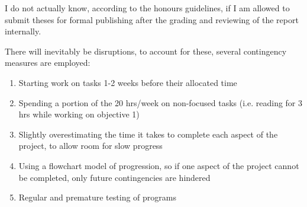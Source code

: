 I do not actually know, according to the honours guidelines, if I am allowed to submit theses for formal publishing after the grading and reviewing of the report internally.

There will inevitably be disruptions, to account for these, several contingency measures are employed:
\begin{enumerate}
\item Starting work on tasks 1-2 weeks before their allocated time
\item Spending a portion of the 20 hrs/week on non-focused tasks (i.e. reading for 3 hrs while working on objective 1)
\item Slightly overestimating the time it takes to complete each aspect of the project, to allow room for slow progress
\item Using a flowchart model of progression, so if one aspect of the project cannot be completed, only future contingencies are hindered
\item Regular and premature testing of programs
\end{enumerate}


